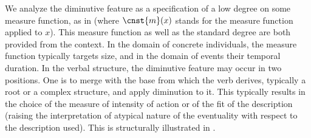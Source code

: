 \documentclass[output=paper,colorlinks,citecolor=brown]{langscibook}
\begin{document}
\noindent We analyze the diminutive feature as a specification of a low degree on some measure function, as in  (where $\cnst{m}(x)$ stands for the measure function applied to $x$). This measure function as well as the standard degree are both provided from the context. In the domain of concrete individuals, the measure function typically targets size, and in the domain of events their temporal duration. In the verbal structure, the diminutive feature may occur in two positions. One is to merge with the base from which the verb derives, typically a root or a complex structure, and apply diminution to it. This typically results in the choice of the measure of intensity of action or of the fit of the description (raising the interpretation of atypical nature of the eventuality with respect to the description used). This is structurally illustrated in . 
\end{document}
